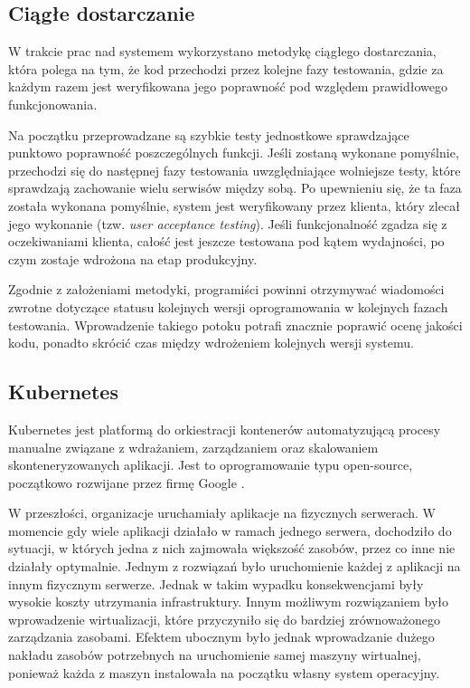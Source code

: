 \subsection{Ciągłe dostarczanie}

W trakcie prac nad systemem wykorzystano metodykę ciągłego dostarczania, która polega na tym, że kod 
przechodzi przez kolejne fazy testowania, gdzie za każdym razem jest weryfikowana jego poprawność pod 
względem prawidłowego funkcjonowania. 

Na początku przeprowadzane są szybkie testy jednostkowe sprawdzające punktowo poprawność 
poszczególnych funkcji. Jeśli zostaną wykonane pomyślnie, przechodzi się do następnej fazy 
testowania uwzględniające wolniejsze testy, które sprawdzają zachowanie wielu serwisów między 
sobą. Po upewnieniu się, że ta faza została wykonana pomyślnie, system jest weryfikowany przez 
klienta, który zlecał jego wykonanie (tzw. \textit{user acceptance testing}). Jeśli funkcjonalność zgadza się z 
oczekiwaniami klienta, całość jest jeszcze testowana pod kątem wydajności, po czym zostaje 
wdrożona na etap produkcyjny.

Zgodnie z założeniami metodyki, programiści powinni otrzymywać
wiadomości zwrotne dotyczące statusu kolejnych wersji 
oprogramowania w kolejnych fazach testowania. Wprowadzenie takiego potoku potrafi znacznie
poprawić ocenę jakości kodu, ponadto skrócić czas między wdrożeniem kolejnych wersji systemu.

\subsection{Kubernetes}

Kubernetes jest platformą do orkiestracji kontenerów automatyzującą procesy manualne 
związane z wdrażaniem, zarządzaniem oraz skalowaniem skonteneryzowanych aplikacji. 
Jest to oprogramowanie typu open-source, początkowo rozwijane przez firmę Google
\cite{kubernetes2022}.

W przeszłości, organizacje uruchamiały aplikacje na fizycznych serwerach. W momencie 
gdy wiele aplikacji działało w ramach jednego serwera, dochodziło do 
sytuacji, w których jedna z nich zajmowała większość zasobów, przez co inne 
nie działały optymalnie. Jednym z rozwiązań było uruchomienie każdej 
z aplikacji na innym fizycznym serwerze. Jednak w takim wypadku konsekwencjami były 
wysokie koszty utrzymania infrastruktury. Innym możliwym rozwiązaniem było wprowadzenie 
wirtualizacji, które przyczyniło się do bardziej zrównoważonego zarządzania zasobami. 
Efektem ubocznym było jednak wprowadzanie dużego nakładu zasobów potrzebnych na 
uruchomienie samej maszyny wirtualnej, ponieważ każda z maszyn instalowała na początku 
własny system operacyjny.

